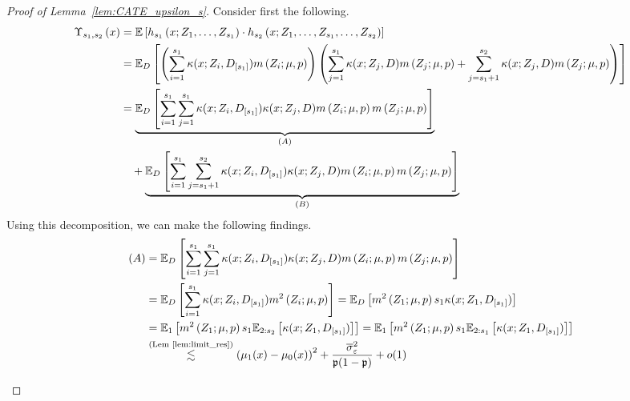 \begin{proof}[Proof of Lemma~\ref{lem:CATE_upsilon_s}]
	Consider first the following.
	\begin{equation}
		\begin{aligned}
			\Upsilon_{s_1, s_2}\left(x\right)
			& = \mathbb{E}\left[h_{s_1}\left(x; Z_1, \ldots,  Z_{s_1}\right) \cdot
			h_{s_2}\left(x; Z_1, \ldots,Z_{s_1}, \ldots, Z_{s_2}\right)\right]\\
			& = \mathbb{E}_{D}\left[
				\left(\sum_{i = 1}^{s_1} \kappa(x; Z_{i}, D_{[s_1]}) m\left(Z_{i}; \mu, p\right)\right)
				\left(\sum_{j = 1}^{s_1} \kappa(x; Z_{j}, D) m\left(Z_{j}; \mu, p\right) 
				+ \sum_{j = s_1 + 1}^{s_2} \kappa(x; Z_{j}, D) m\left(Z_{j}; \mu, p\right)\right)
			\right]     \\
			& = \underbrace{\mathbb{E}_{D}\left[\sum_{i = 1}^{s_1}\sum_{j = 1}^{s_1}\kappa(x; Z_{i}, D_{[s_1]})\kappa(x; Z_{j}, D) m\left(Z_{i}; \mu, p\right)m\left(Z_{j}; \mu, p\right)\right]}_{(A)}\\
			& \quad + \underbrace{\mathbb{E}_{D}\left[\sum_{i = 1}^{s_1}\sum_{j = s_1 + 1}^{s_2}\kappa(x; Z_{i}, D_{[s_1]})\kappa(x; Z_{j}, D) m\left(Z_{i}; \mu, p\right)m\left(Z_{j}; \mu, p\right)\right]}_{(B)}
		\end{aligned}
	\end{equation}
	Using this decomposition, we can make the following findings.
	\begin{equation}
		\begin{aligned}
			(A)
			& = \mathbb{E}_{D}\left[\sum_{i = 1}^{s_1}\sum_{j = 1}^{s_1}\kappa(x; Z_{i}, D_{[s_1]})\kappa(x; Z_{j}, D) m\left(Z_{i}; \mu, p\right)m\left(Z_{j}; \mu, p\right)\right] \\
			& = \mathbb{E}_{D}\left[\sum_{i = 1}^{s_1} \kappa(x; Z_{i}, D_{[s_1]}) m^2\left(Z_{i}; \mu, p\right)\right] 
			= \mathbb{E}_{D}\left[m^2\left(Z_{1}; \mu, p\right) s_1 \kappa(x; Z_{1}, D_{[s_1]}) \right] \\
			& = \mathbb{E}_{1}\left[m^2\left(Z_{1}; \mu, p\right) s_1 \mathbb{E}_{2:s_2}\left[\kappa(x; Z_{1}, D_{[s_1]})\right]\right]
			= \mathbb{E}_{1}\left[m^2\left(Z_{1}; \mu, p\right) s_1 \mathbb{E}_{2:s_1}\left[\kappa(x; Z_{1}, D_{[s_1]})\right]\right]\\
			& \overset{\text{(Lem~\ref{lem:limit_res})}}{\lesssim} \left(\mu_1(x) - \mu_0(x)\right)^2 + \frac{\overline{\sigma}^2_{\varepsilon}}{\mathfrak{p}(1 - \mathfrak{p})} + o(1)
		\end{aligned}
	\end{equation}
	\begin{equation}
		\begin{aligned}

\end{aligned}
\end{equation}
\end{proof}
